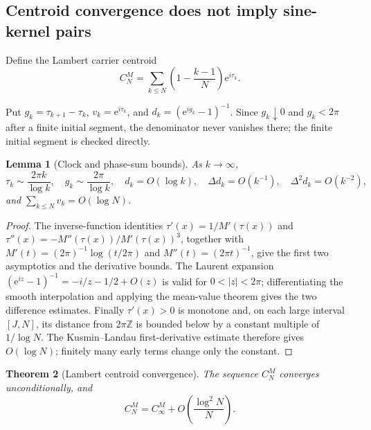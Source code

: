 \documentclass[11pt]{amsart}
\newtheorem{theorem}{Theorem}[section]
\newtheorem{lemma}[theorem]{Lemma}
\theoremstyle{definition}
\theoremstyle{remark}
\newcommand{\ee}{\mathrm e}
\begin{document}
\subsection{Centroid convergence does not imply sine-kernel pairs}

Define the Lambert carrier centroid
\begin{equation}\label{eq:carrier_centroid}
C_N^M=\sum_{k\leq N}\left(1-\frac{k-1}{N}\right)\ee^{i\tau_k}.
\end{equation}

Put $g_k=\tau_{k+1}-\tau_k$, $v_k=\ee^{i\tau_k}$, and
$d_k=(\ee^{ig_k}-1)^{-1}$.  Since $g_k\downarrow0$ and $g_k<2\pi$ after a
finite initial segment, the denominator never vanishes there; the finite
initial segment is checked directly.

\begin{lemma}[Clock and phase-sum bounds]\label{lem:carrier_bounds}
As $k\to\infty$,
\[
\tau_k\sim\frac{2\pi k}{\log k},\quad
g_k\sim\frac{2\pi}{\log k},\quad
d_k=O(\log k),\quad \Delta d_k=O(k^{-1}),\quad
\Delta^2d_k=O(k^{-2}),
\]
and $\sum_{k\le N}v_k=O(\log N)$.
\end{lemma}

\begin{proof}
The inverse-function identities
$\tau'(x)=1/M'(\tau(x))$ and
$\tau''(x)=-M''(\tau(x))/M'(\tau(x))^3$, together with
$M'(t)=(2\pi)^{-1}\log(t/2\pi)$ and $M''(t)=(2\pi t)^{-1}$, give the first two
asymptotics and the derivative bounds.  The Laurent expansion
$(\ee^{iz}-1)^{-1}=-i/z-1/2+O(z)$ is valid for $0<|z|<2\pi$; differentiating
the smooth interpolation and applying the mean-value theorem gives the two
difference estimates.  Finally $\tau'(x)>0$ is monotone and, on each large
interval $[J,N]$, its distance from $2\pi\mathbb Z$ is bounded below by a
constant multiple of $1/\log N$.  The Kusmin--Landau first-derivative estimate
therefore gives $O(\log N)$; finitely many early terms change only the constant.
\end{proof}

\begin{theorem}[Lambert centroid convergence]\label{thm:carrier_centroid}
The sequence $C_N^M$ converges unconditionally, and
\begin{equation}\label{eq:carrier_rate}
C_N^M=C_\infty^M+O\!\left(\frac{\log^2N}{N}\right).
\end{equation}
\end{theorem}
\end{document}
